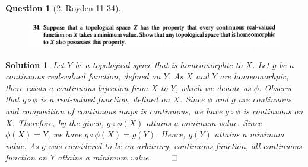 \documentclass{article} %
\theoremstyle{quest}
\newtheorem*{question}{Question}
\newtheorem*{solution}{Solution}
\begin{document}
\bigskip

\begin{question}[2. Royden 11-34]
\hfill
\begin{figure}[h!]
  \centering
    \includegraphics[width=1\textwidth]{11-34}
\end{figure}
\end{question}
\begin{solution}
Let $Y$ be a topological space that is homeomorphic to $X$. 
Let $g$ be a continuous real-valued function, defined on $Y$.
As $X$ and $Y$ are homeomorhpic, there exists a continuous bijection
from $X$ to $Y$, which we denote as $\phi$. Observe that 
$g \circ \phi$ is a real-valued function, defined on $X$. Since $\phi$
and $g$ are continuous, and composition of continuous maps is continuous,
we have $g \circ \phi$ is continuous on $X$. Therefore, by the given, 
$g \circ \phi(X)$ attains a minimum value. Since $\phi(X) = Y$, we have
$g \circ \phi(X) = g(Y)$. Hence, $g(Y)$ attains a minimum value. As $g$
was considered to be an arbitrary, continuous function,
all continuous function on $Y$ attains a minimum value. \hfill $\qed$ 

\end{solution}

\bigskip
\end{document}
